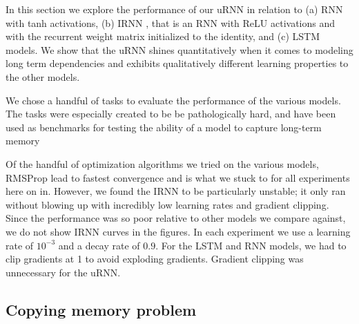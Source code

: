\documentclass{article} %
\begin{document}
In this section we explore the performance of our uRNN in relation to (a) RNN with tanh activations,
(b) IRNN \citep{Quoc2015}, that is 
an RNN with ReLU activations and with the recurrent weight matrix initialized to the identity, 
and (c) LSTM \citep{LSTM} models. We show that the uRNN shines quantitatively when it comes to modeling 
long term dependencies and exhibits qualitatively different learning properties to the other models. 
 
We chose a handful of tasks to evaluate the performance of the various models.
The tasks were especially created to be be pathologically hard, and have been used 
as benchmarks for testing the ability of a model to capture long-term memory \citep{LSTM, Quoc2015, NTM, HF}

Of the handful of optimization algorithms we tried on the various models, 
RMSProp \citep{RMSPROP} lead to fastest convergence and is what we stuck to for all
experiments here on in. However, we found the IRNN to be particularly unstable; it only ran without 
blowing up with incredibly low learning rates and gradient clipping. Since the performance was so poor
relative to other models we compare against, we do not show IRNN curves in the figures.  
In each experiment we use a learning rate of $10^{-3}$
and a decay rate of $0.9$. For the LSTM and RNN models, we had to clip gradients at 1 to avoid exploding 
gradients. Gradient clipping was unnecessary for the uRNN.


\subsection{Copying memory problem}
\end{document}
